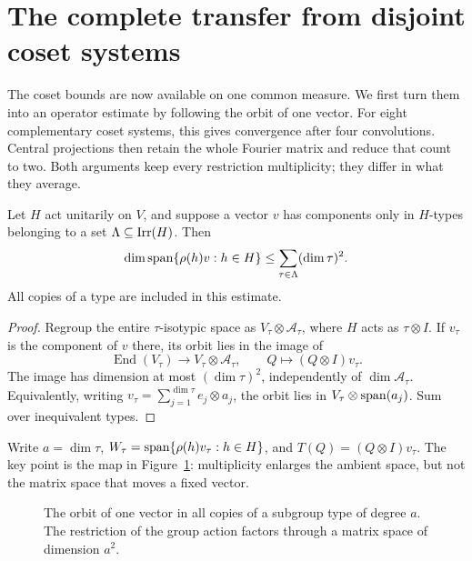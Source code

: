\section{The complete transfer from disjoint coset systems}
\label{l:core-section}

The coset bounds are now available on one common measure. We first turn them into an operator estimate by following the orbit of one vector. For eight complementary coset systems, this gives convergence after four convolutions. Central projections then retain the whole Fourier matrix and reduce that count to two. Both arguments keep every restriction multiplicity; they differ in what they average.

\begin{lemma}\label{l:single-orbit}
Let $H$ act unitarily on $V$, and suppose a vector $v$ has components only in $H$-types belonging to a set $\Lambda\subseteq\operatorname{Irr}(H)$. Then
\[
 \dim\operatorname{span}\{\rho(h)v:h\in H\}\le\sum_{\tau\in\Lambda}(\dim\tau)^2.
\]
All copies of a type are included in this estimate.
\end{lemma}
\begin{proof}
Regroup the entire $\tau$-isotypic space as $V_\tau\otimes\mathcal A_\tau$, where $H$ acts as $\tau\otimes I$. If $v_\tau$ is the component of $v$ there, its orbit lies in the image of
\[
 \operatorname{End}(V_\tau)\longrightarrow V_\tau\otimes\mathcal A_\tau,
 \qquad Q\longmapsto(Q\otimes I)v_\tau.
\]
The image has dimension at most $(\dim\tau)^2$, independently of $\dim\mathcal A_\tau$. Equivalently, writing $v_\tau=\sum_{j=1}^{\dim\tau}e_j\otimes a_j$, the orbit lies in $V_\tau\otimes\operatorname{span}(a_j)$. Sum over inequivalent types.
\end{proof}

Write $a=\dim\tau$, $W_\tau=\operatorname{span}\{\rho(h)v_\tau:h\in H\}$, and $T(Q)=(Q\otimes I)v_\tau$. The key point is the map in Figure~\ref{l:orbit-figure}: multiplicity enlarges the ambient space, but not the matrix space that moves a fixed vector.

\begin{figure}[ht]
\centering
{}
\caption{The orbit of one vector in all copies of a subgroup type of degree $a$. The restriction of the group action factors through a matrix space of dimension $a^2$.}
\label{l:orbit-figure}
\end{figure}

